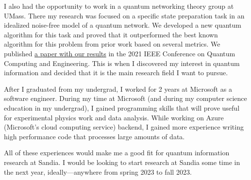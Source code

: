 \documentclass{article}
\begin{document}
	I also had the opportunity to work in a quantum networking theory group at UMass. There my research was focused on a specific state preparation task in an idealized noise-free model of a quantum network. We developed a new quantum algorithm for this task and proved that it outperformed the best known algorithm for this problem from prior work based on several metrics. We published \href{https://arxiv.org/abs/2009.10888}{a paper with our results} in the 2021 IEEE Conference on Quantum Computing and Engineering. This is when I discovered my interest in quantum information and decided that it is the main research field I want to pursue.
	
	After I graduated from my undergrad, I worked for 2 years at Microsoft as a software engineer. During my time at Microsoft (and during my computer science education in my undergrad), I gained programming skills that will prove useful for experimental physics work and data analysis. While working on Azure (Microsoft's cloud computing service) backend, I gained more experience writing high performance code that processes large amounts of data.
	
	All of these experiences would make me a good fit for quantum information research at Sandia. I would be looking to start research at Sandia some time in the next year, ideally---anywhere from spring 2023 to fall 2023.
\end{document}
